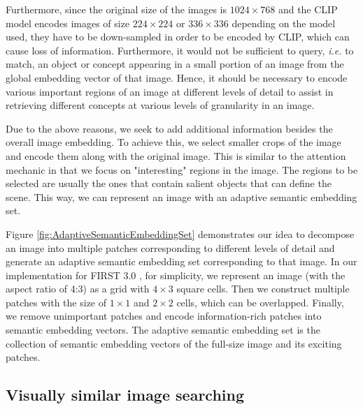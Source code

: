Furthermore, since the original size of the images is $1024 \times 768$ and the CLIP model encodes images of size $224 \times 224$ or $336 \times 336$ depending on the model used, they have to be down-sampled in order to be encoded by CLIP, which can cause loss of information. Furthermore, it would not be sufficient to query, \textit{i.e.} to match, an object or concept appearing in a small portion of an image from the global embedding vector of that image. Hence, it should be necessary to encode various important regions of an image at different levels of detail to assist in retrieving different concepts at various levels of granularity in an image.

Due to the above reasons, we seek to add additional information besides the overall image embedding. To achieve this, we select smaller crops of the image and encode them along with the original image. This is similar to the attention mechanic in that we focus on "interesting" regions in the image. The regions to be selected are usually the ones that contain salient objects that can define the scene. This way, we can represent an image with an adaptive semantic embedding set.

Figure \ref{fig:AdaptiveSemanticEmbeddingSet} demonstrates our idea to decompose an image into multiple patches corresponding to different levels of detail and generate an adaptive semantic embedding set corresponding to that image. In our implementation for FIRST 3.0 , for simplicity, we represent an image (with the aspect ratio of 4:3) as a grid with $4 \times 3$ square cells. Then we construct multiple patches with the size of $1 \times 1$ and $2 \times 2$ cells, which can be overlapped. Finally, we remove unimportant patches and encode information-rich patches into semantic embedding vectors. The adaptive semantic embedding set is the collection of semantic embedding vectors of the full-size image and its exciting patches.

\subsection{Visually similar image searching}

